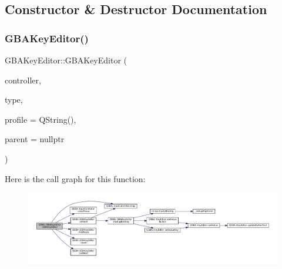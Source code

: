 \subsection{Constructor \& Destructor Documentation}
\mbox{\label{class_q_g_b_a_1_1_g_b_a_key_editor_aed049193bfbbca0ad5d08277d111944c}} 
\subsubsection{\texorpdfstring{G\+B\+A\+Key\+Editor()}{GBAKeyEditor()}}
{\footnotesize\ttfamily G\+B\+A\+Key\+Editor\+::\+G\+B\+A\+Key\+Editor (\begin{DoxyParamCaption}\item[{\mbox{\hyperlink{class_q_g_b_a_1_1_input_controller}{Input\+Controller}} $\ast$}]{controller,  }\item[{\mbox{\hyperlink{ioapi_8h_a787fa3cf048117ba7123753c1e74fcd6}{int}}}]{type,  }\item[{const Q\+String \&}]{profile = {\ttfamily QString()},  }\item[{Q\+Widget $\ast$}]{parent = {\ttfamily nullptr} }\end{DoxyParamCaption})}

Here is the call graph for this function\+:
\nopagebreak
\begin{figure}[H]
\begin{center}
\leavevmode
\includegraphics[width=350pt]{class_q_g_b_a_1_1_g_b_a_key_editor_aed049193bfbbca0ad5d08277d111944c_cgraph}
\end{center}
\end{figure}
\mbox{\label{class_q_g_b_a_1_1_g_b_a_key_editor_aa382ba1e6de362617296a3803cea41e7}} 
